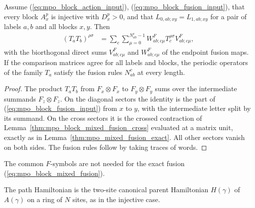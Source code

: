 \begin{lemma}
    \label{thm:mpo_block_mixed_fusion}
    \leanok
    Assume (\ref{eq:mpo_block_action_input}),
    (\ref{eq:mpo_block_fusion_input}), that every block $A^p_x$ is
    injective with $D^p_x>0$, and that $L_{0,ab;xy}=L_{1,ab;xy}$ for a pair
    of labels $a,b$ and all blocks $x,y$. Then
    \begin{align}
        (T_aT_b)^{\rho\sigma}
         & =\sum_c\sum_{\mu=0}^{N_{ab}^c-1}
        W^F_{ab;c\mu}T_c^{\rho\sigma}V^F_{ab;c\mu},
        \label{eq:mpo_block_mixed_fusion}
    \end{align}
    with the biorthogonal direct sums $V^F_{ab;c\mu}$ and $W^F_{ab;c\mu}$
    of the endpoint fusion maps. If the comparison matrices agree for all
    labels and blocks, the periodic operators of the family $T_a$ satisfy
    the fusion rules $N_{ab}^c$ at every length.
\end{lemma}
\begin{proof}
    \leanok
    The product $T_aT_b$ from $F_x\otimes F_x$ to $F_y\otimes F_y$ sums over
    the intermediate summands $F_z\otimes F_z$. On the diagonal sectors
    the identity is the part of (\ref{eq:mpo_block_fusion_input}) from $x$
    to $y$, with the intermediate letter split by its summand. On the cross
    sectors it is the crossed contraction of
    Lemma~\ref{thm:mpo_block_mixed_fusion_cross} evaluated at a matrix unit,
    exactly as in Lemma~\ref{thm:mpo_mixed_fusion_exact}. All other
    sectors vanish on both sides. The fusion rules follow by taking traces
    of words.
\end{proof}

The common $F$-symbols are not needed for the exact fusion
(\ref{eq:mpo_block_mixed_fusion}).

The path Hamiltonian is the two-site canonical parent Hamiltonian
$H(\gamma)$ of $A(\gamma)$ on a ring of $N$ sites, as in the injective
case.

